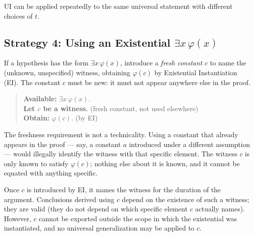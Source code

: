 \begin{exposition}
UI can be applied repeatedly to the same universal statement with different
choices of $t$.
\end{exposition}


\subsection*{\texorpdfstring{Strategy 4: Using an Existential $\exists x\,\varphi(x)$}{Strategy 4: Using an Existential exists x phi(x)}}

\begin{exposition}
If a hypothesis has the form $\exists x\,\varphi(x)$, introduce a \emph{fresh
constant} $c$ to name the (unknown, unspecified) witness, obtaining $\varphi(c)$
by Existential Instantiation (EI). The constant $c$ must be new: it must not
appear anywhere else in the proof.
\end{exposition}

\begin{quote}
\textbf{Available:} $\exists x\,\varphi(x)$.\\
\textbf{Let $c$ be a witness.} (fresh constant, not used elsewhere)\\
\textbf{Obtain:} $\varphi(c)$. \quad (by EI)
\end{quote}

\begin{exposition}
The freshness requirement is not a technicality. Using a constant that already
appears in the proof --- say, a constant $a$ introduced under a different
assumption --- would illegally identify the witness with that specific element.
The witness $c$ is only known to satisfy $\varphi(c)$; nothing else about it
is known, and it cannot be equated with anything specific.
\end{exposition}

\begin{remark*}
Once $c$ is introduced by EI, it names the witness for the duration of the
argument. Conclusions derived using $c$ depend on the existence of such a
witness; they are valid (they do not depend on which specific element $c$
actually names). However, $c$ cannot be exported outside the scope in which
the existential was instantiated, and no universal generalization may be
applied to $c$.
\end{remark*}


